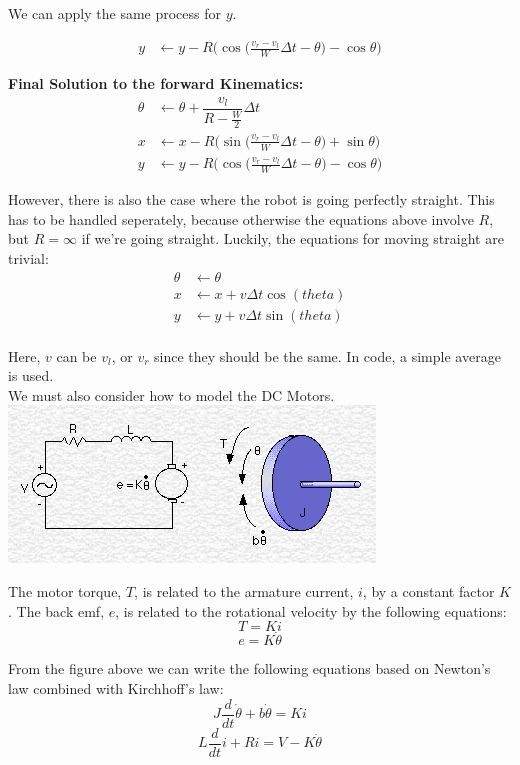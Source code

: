 \documentclass{article}
\begin{document}
We can apply the same process for $y$.

\begin{align}
  y &\leftarrow y-R\Bigg(\cos{\Big(\frac{v_r-v_l}{W}\Delta t-\theta\Big)}-\cos{\theta}\Bigg)
\end{align}

\textbf{Final Solution to the forward Kinematics:}
\begin{align}
 \theta &\leftarrow \theta + \dfrac{v_l}{R-\frac{W}{2}}\Delta t \\
  x &\leftarrow x-R\Bigg(\sin{\Big(\frac{v_r-v_l}{W}\Delta t-\theta\Big)}+\sin{\theta}\Bigg) \\
  y &\leftarrow y-R\Bigg(\cos{\Big(\frac{v_r-v_l}{W}\Delta t-\theta\Big)}-\cos{\theta}\Bigg)
\end{align}

However, there is also the case where the robot is going perfectly straight. This has to be handled seperately, because otherwise the equations above involve $R$, but $R=\infty$ if we're going straight. Luckily, the equations for moving straight are trivial:
\begin{align}
 \theta &\leftarrow \theta \\
  x &\leftarrow x + v\Delta t\cos(theta) \\
  y &\leftarrow y + v\Delta t\sin(theta) \\
\end{align}

Here, $v$ can be $v_l$, or $v_r$ since they should be the same. In code, a simple average is used. \\

We must also consider how to model the DC Motors. \\

\includegraphics[scale=0.5]{./dc_motor_model.png}

The motor torque, $T$, is related to the armature current, $i$, by a constant factor $K$. The back emf, $e$, is related to the rotational velocity by the following equations:
$$T=Ki$$
$$e=K\dot{\theta}$$

From the figure above we can write the following equations based on Newton's law combined with Kirchhoff's law:
$$J\frac{d}{dt}\dot{\theta} + b\dot{\theta} = Ki$$
$$L\frac{d}{dt}i+Ri=V-K\dot{\theta}$$
\end{document}
